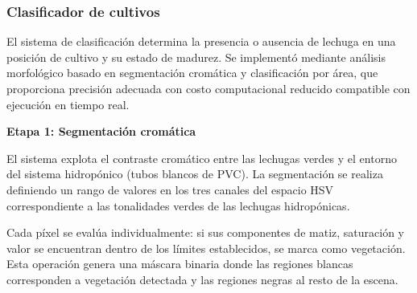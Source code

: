 \subsubsection{Clasificador de cultivos}

El sistema de clasificación determina la presencia o ausencia de lechuga en una posición de cultivo y su estado de madurez. Se implementó mediante análisis morfológico basado en segmentación cromática y clasificación por área, que proporciona precisión adecuada con costo computacional reducido compatible con ejecución en tiempo real.

\textbf{Etapa 1: Segmentación cromática}

El sistema explota el contraste cromático entre las lechugas verdes y el entorno del sistema hidropónico (tubos blancos de PVC). La segmentación se realiza definiendo un rango de valores en los tres canales del espacio HSV correspondiente a las tonalidades verdes de las lechugas hidropónicas.

Cada píxel se evalúa individualmente: si sus componentes de matiz, saturación y valor se encuentran dentro de los límites establecidos, se marca como vegetación. Esta operación genera una máscara binaria donde las regiones blancas corresponden a vegetación detectada y las regiones negras al resto de la escena.

